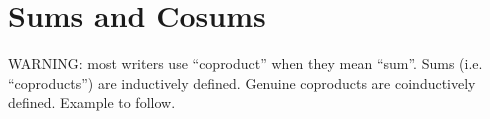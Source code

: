 \chapter{Sums and Cosums}

WARNING: most writers use ``coproduct'' when they mean ``sum''. Sums
(i.e. ``coproducts'') are inductively defined. Genuine coproducts are
coinductively defined.  Example to follow.

